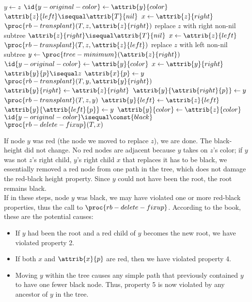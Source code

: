 \documentclass{article}
\begin{document}
\begin{codebox}
\li $y \gets{z}$
\li $\id{y-original-color} \gets{\attrib{y}{color}}$
\li \If $\attrib{z}{left} \isequal \attrib{T}{nil}$
\li \Then
        $x \gets{\attrib{z}{right}}$
\li     $\proc{rb-transplant}(T, z, \attrib{z}{right})$ \Comment replace $z$ with right non-nil subtree
\li \ElseIf $\attrib{z}{right} \isequal \attrib{T}{nil}$
\li \Then
        $x \gets{\attrib{z}{left}}$
\li     $\proc{rb-transplant}(T, z, \attrib{z}{left})$ \Comment replace $z$ with left non-nil subtree
\li \Else
\li     $y \gets{\proc{tree-minimum}(\attrib{z}{right})}$
\li     $\id{y-original-color} \gets{\attrib{y}{color}}$
\li     $x \gets{\attrib{y}{right}}$
\li     \If $\attrib{y}{p} \isequal z$
\li     \Then
            $\attrib{x}{p} \gets{y}$
\li     \Else
            $\proc{rb-transplant}(T, y, \attrib{y}{right})$
\li         $\attrib{y}{right} \gets{\attrib{z}{right}}$
\li         $\attrib{y}{\attrib{right}{p}} \gets{y}$
        \End
\li     $\proc{rb-transplant}(T, z, y)$
\li     $\attrib{y}{left} \gets{\attrib{z}{left}}$
\li     $\attrib{y}{\attrib{left}{p}} \gets{y}$
\li     $\attrib{y}{color} \gets{\attrib{z}{color}}$
    \End
\li \If $\id{y-original-color} \isequal \const{black}$
\li \Then
        $\proc{rb-delete-fixup}(T, x)$
    \End
\end{codebox}

If node $y$ was red (the node we moved to replace $z$), we are done. The black-height did not change. No red nodes are adjacent because $y$ takes on $z$'s color; if $y$ was not $z$'s right child, $y$'s right child $x$ that replaces it has to be black, we essentially removed a red node from one path in the tree, which does not damage the red-black height property. Since $y$ could not have been the root, the root remains black.
\\
If in these steps, node $y$ was black, we may have violated one or more red-black properties, thus the call to $\proc{rb-delete-fixup}$. According to the book, these are the potential causes:

\begin{itemize}
    \item If $y$ had been the root and a red child of $y$ becomes the new root, we have violated property 2.
    \item If both $x$ and $\attrib{x}{p}$ are red, then we have violated property 4.
    \item Moving $y$ within the tree causes any simple path that previously contained $y$ to have one fewer black node. Thus, property 5 is now violated by any ancestor of $y$ in the tree.
\end{itemize}
\end{document}

